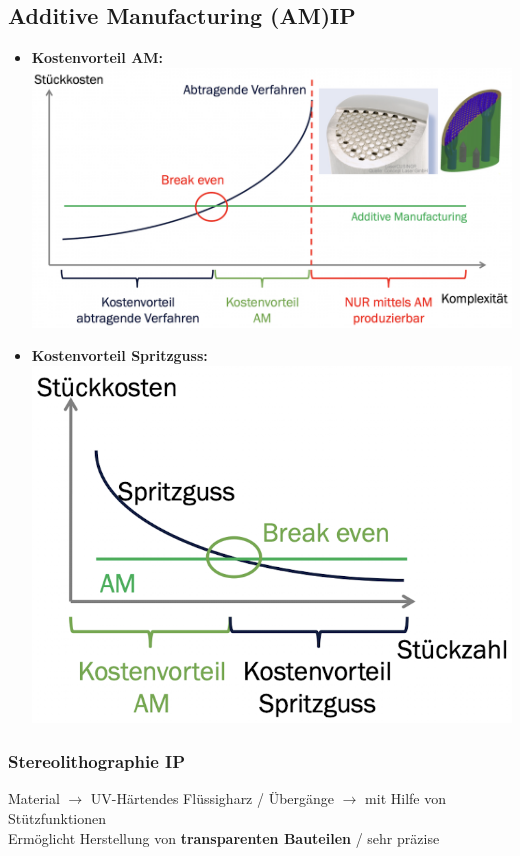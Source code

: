 \subsection{Additive Manufacturing (AM)\hfill IP}
    \begin{footnotesize}
        \begin{itemize}
            \item \textbf{Kostenvorteil AM:}
            \\\includegraphics[width = 0.8\linewidth]{MAEIP_AM}

            \item \textbf{Kostenvorteil Spritzguss:}
            \\\includegraphics[width = 0.5\linewidth]{MAEIP_KostenvorteilSpritzguss}
        \end{itemize}
    \end{footnotesize}

    \subsubsection{Stereolithographie \hfill IP}
    \begin{scriptsize}
        Material $\to$ UV-Härtendes Flüssigharz / Übergänge $\to$ mit Hilfe von Stützfunktionen
        \\Ermöglicht Herstellung von \textbf{transparenten Bauteilen} / sehr präzise
    \end{scriptsize}

